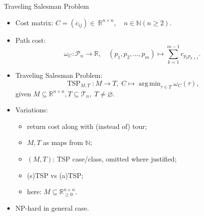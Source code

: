 \documentclass[
  size=8pt,
  style=klope,
  paper=screen,
  pauseslide,
  nopagebreaks,
  hlsections,
  fleqn
]{powerdot}
\DeclareMathOperator*{\argmin}{arg\,min}
\def\eqitspace{\vspace{-5mm}}
\begin{document}
\begin{slide}{Traveling Salesman Problem}
\begin{itemize}
  \item
  Cost matrix: $C = \left(c_{ij}\right) \in~\mathbb{R}^{n \times n},
    \quad n \in \mathbb{N} \left(n \geq 2\right)$.
  \item
  Path cost:
  \vspace{-2mm}
  \begin{equation}
    \omega_C: \mathcal{P}_n \to \mathbb{R}, \quad
    \left(p_1,p_2,\ldots,p_m\right) \mapsto \sum_{k=1}^{m-1} c_{p_k p_{k+1}}.
  \end{equation}
  \eqitspace%
  \item
  Traveling Salesman Problem:
  \begin{equation}
    \operatorname{TSP}_{M,T} : M \to T, \; C \mapsto \argmin_{\tau \in T} \omega_C\left(\tau\right),
  \end{equation}
  given $M \subseteq \mathbb{R}^{n \times n}, T \subseteq \mathcal{T}_n, \; T \neq \varnothing$.
  \item
  Variations:
  \begin{itemize}
  \item return cost along with (instead of) tour;
  \item $M, T$ as maps from $\mathbb{N}$;
  \item $(M, T)$: TSP case/class, omitted where justified;
  \item (s)TSP vs (a)TSP\@;
  \item here: $M \subseteq \mathbb{R}^{n \times n}_{\geq 0}$.
  \end{itemize}
  \vspace{-2mm}
  \item
  NP-hard in general case.
\end{itemize}
\end{slide}
\end{document}

